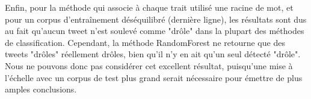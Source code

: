 \documentclass[10pt,a4paper,twoside]{article}
\begin{document}
Enfin, pour la méthode qui associe à chaque trait utilisé une racine de mot, et pour un corpus d'entraînement déséquilibré (dernière ligne), les résultats sont dus au fait qu'aucun tweet n'est soulevé comme "drôle" dans la plupart des méthodes de classification. Cependant, la méthode RandomForest ne retourne que des tweets "drôles" réellement drôles, bien qu'il n'y en ait qu'un seul détecté "drôle". Nous ne pouvons donc pas considérer cet excellent résultat, puisqu'une mise à l'échelle avec un corpus de test plus grand serait nécessaire pour émettre de plus amples conclusions.




\end{document}
